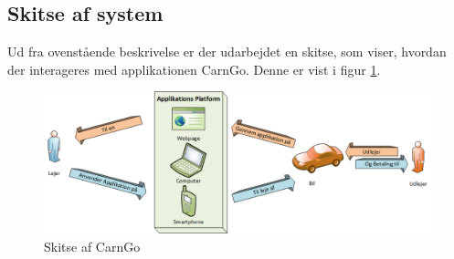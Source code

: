 \documentclass[Rapport/Rapport_main.tex]{subfiles}
\begin{document}
\subsection{Skitse af system}
Ud fra ovenstående beskrivelse er der udarbejdet en skitse, som viser, hvordan der interageres med applikationen CarnGo. Denne er vist i figur \ref{fig:CarnGo_skitse}.

\begin{figure}[H]
    \centering
    \includegraphics[width=\textwidth]{Projektformulering/graphic/SystemSkitsePRJ4.png}
    \caption{Skitse af CarnGo}
    \label{fig:CarnGo_skitse}
\end{figure}
\end{document}
